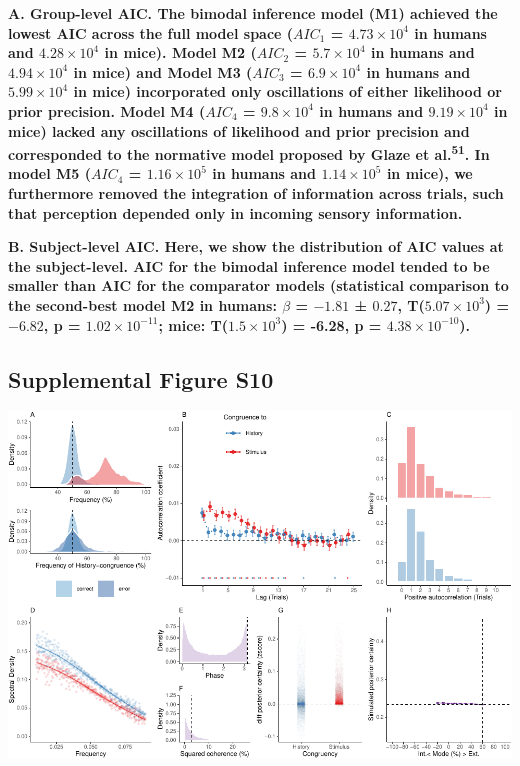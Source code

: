 \documentclass[
]{article}
\begin{document}
\textbf{A. Group-level AIC. The bimodal inference model (M1) achieved
the lowest AIC across the full model space (\(AIC_1\) =
\(\ensuremath{4.73\times 10^{4}}\) in humans and
\(\ensuremath{4.28\times 10^{4}}\) in mice). Model M2 (\(AIC_2\) =
\(\ensuremath{5.7\times 10^{4}}\) in humans and
\(\ensuremath{4.94\times 10^{4}}\) in mice) and Model M3 (\(AIC_3\) =
\(\ensuremath{6.9\times 10^{4}}\) in humans and
\(\ensuremath{5.99\times 10^{4}}\) in mice) incorporated only
oscillations of either likelihood or prior precision. Model M4
(\(AIC_4\) = \(\ensuremath{9.8\times 10^{4}}\) in humans and
\(\ensuremath{9.19\times 10^{4}}\) in mice) lacked any oscillations of
likelihood and prior precision and corresponded to the normative model
proposed by Glaze et al.\textsuperscript{51}. In model M5 (\(AIC_4\) =
\(\ensuremath{1.16\times 10^{5}}\) in humans and
\(\ensuremath{1.14\times 10^{5}}\) in mice), we furthermore removed the
integration of information across trials, such that perception depended
only in incoming sensory information.}

\textbf{B. Subject-level AIC. Here, we show the distribution of AIC
values at the subject-level. AIC for the bimodal inference model tended
to be smaller than AIC for the comparator models (statistical comparison
to the second-best model M2 in humans: \(\beta\) = \(-1.81\) ± \(0.27\),
T(\(\ensuremath{5.07\times 10^{3}}\)) = \(-6.82\), p =
\(\ensuremath{1.02\times 10^{-11}}\); mice:
T(\(\ensuremath{1.5\times 10^{3}}\)) = -6.28, p =
\(\ensuremath{4.38\times 10^{-10}}\)).}

\newpage

\hypertarget{supplemental-figure-s10}{%
\subsection{Supplemental Figure S10}\label{supplemental-figure-s10}}

\includegraphics{modes_mouse_rev1b_files/figure-latex/Supplemental_Figure_S10-1.pdf}
\end{document}
